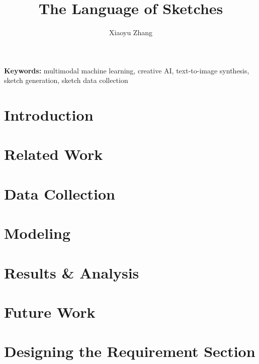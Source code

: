 \documentclass[twoside]{report}
\newcommand\blankpage{%
  \null
  \newpage}
\begin{document}
    \title{The Language of Sketches}
\author{Xiaoyu Zhang}

\beforepreface
\null
\thispagestyle{empty}%
\addtocounter{page}{-1}%
\vspace*{8in}
\textbf{Keywords:} multimodal machine learning, creative AI, text-to-image synthesis, sketch generation, sketch data collection
\newpage



\afterpage{\blankpage}




\afterpage{\blankpage}

\tableofcontents
\null
\newpage
\afterpage{\blankpage}

\clearpage
{}
\pagestyle{headings}

\chapter{Introduction} \label{introductionChapter}


\chapter{Related Work} \label{relatedWorkChapter}


\chapter{Data Collection} \label{dataChapter}


\chapter{Modeling} \label{modelingChapter}


\chapter{Results \& Analysis} \label{analysisChapter}



\chapter{Future Work} \label{futureChapter}


\appendix
\chapter{Designing the Requirement Section} \label{appendixDataV1Req}


\renewcommand{\bibname}{Bibliography}


\end{document}
